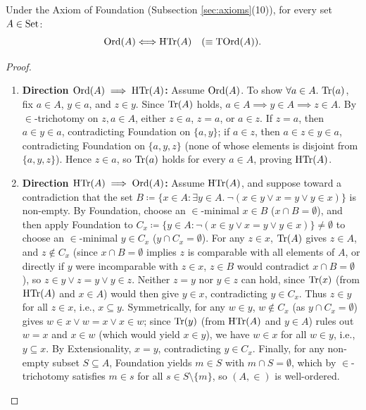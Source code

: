 \documentclass[10pt,a4paper]{article}
\renewcommand{\myprf}{\begin{proof}}
\renewcommand{\myqed}{\end{proof}}
\begin{document}
\begin{theorem}\label{thm:ord_htr_equiv}
Under the Axiom of Foundation (Subsection \ref{sec:axioms}(10)), for every set $A \in {\textrm{Set}}$:
$${\textrm{Ord}}(A) \Longleftrightarrow {\textrm{HTr}}(A) \quad (\equiv {\textrm{TOrd}}(A)).$$
\end{theorem}
\myprf
\begin{enumerate}
\item \textbf{Direction ${\textrm{Ord}}(A) \implies {\textrm{HTr}}(A)$:} Assume ${\textrm{Ord}}(A)$. To show $\forall a \in A.\ {\textrm{Tr}}(a)$, fix $a \in A$, $y \in a$, and $z \in y$. Since ${\textrm{Tr}}(A)$ holds, $a \in A \implies y \in A \implies z \in A$. By $\in$-trichotomy on $z, a \in A$, either $z \in a$, $z = a$, or $a \in z$. If $z = a$, then $a \in y \in a$, contradicting Foundation on $\{a, y\}$; if $a \in z$, then $a \in z \in y \in a$, contradicting Foundation on $\{a, y, z\}$ (none of whose elements is disjoint from $\{a, y, z\}$). Hence $z \in a$, so ${\textrm{Tr}}(a)$ holds for every $a \in A$, proving ${\textrm{HTr}}(A)$.
\item \textbf{Direction ${\textrm{HTr}}(A) \implies {\textrm{Ord}}(A)$:} Assume ${\textrm{HTr}}(A)$, and suppose toward a contradiction that the set $B \coloneqq \{x \in A : \exists y \in A.\ \neg(x \in y \lor x = y \lor y \in x)\}$ is non-empty. By Foundation, choose an $\in$-minimal $x \in B$ ($x \cap B = \emptyset$), and then apply Foundation to $C_x \coloneqq \{y \in A : \neg(x \in y \lor x = y \lor y \in x)\} \neq \emptyset$ to choose an $\in$-minimal $y \in C_x$ ($y \cap C_x = \emptyset$). For any $z \in x$, ${\textrm{Tr}}(A)$ gives $z \in A$, and $z \notin C_x$ (since $x \cap B = \emptyset$ implies $z$ is comparable with all elements of $A$, or directly if $y$ were incomparable with $z \in x$, $z \in B$ would contradict $x \cap B = \emptyset$), so $z \in y \lor z = y \lor y \in z$. Neither $z = y$ nor $y \in z$ can hold, since ${\textrm{Tr}}(x)$ (from ${\textrm{HTr}}(A)$ and $x \in A$) would then give $y \in x$, contradicting $y \in C_x$. Thus $z \in y$ for all $z \in x$, i.e., $x \subseteq y$. Symmetrically, for any $w \in y$, $w \notin C_x$ (as $y \cap C_x = \emptyset$) gives $w \in x \lor w = x \lor x \in w$; since ${\textrm{Tr}}(y)$ (from ${\textrm{HTr}}(A)$ and $y \in A$) rules out $w = x$ and $x \in w$ (which would yield $x \in y$), we have $w \in x$ for all $w \in y$, i.e., $y \subseteq x$. By Extensionality, $x = y$, contradicting $y \in C_x$. Finally, for any non-empty subset $S \subseteq A$, Foundation yields $m \in S$ with $m \cap S = \emptyset$, which by $\in$-trichotomy satisfies $m \in s$ for all $s \in S \setminus \{m\}$, so $(A, \in)$ is well-ordered.
\end{enumerate}
\myqed
\end{document}
